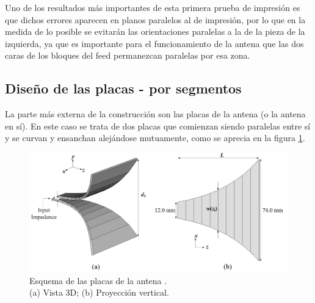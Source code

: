 \documentclass[11pt,a4paper,twoside,pdf]{article}
\numberwithin{equation}{section}
\begin{document}
Uno de los resultados más importantes de esta primera prueba de impresión es que dichos errores aparecen en planos paralelos al de impresión, por lo que en la medida de lo posible se evitarán las orientaciones paralelas a la de la pieza de la izquierda, ya que es importante para el funcionamiento de la antena que las dos caras de los bloques del feed permanezcan paralelas por esa zona.

\subsection{Diseño de las placas - por segmentos}\label{subsec:disSegmentos}

La parte más externa de la construcción son las placas de la antena (o la antena en sí). En este caso se trata de dos placas que comienzan siendo paralelas entre sí y se curvan y ensanchan alejándose mutuamente, como se aprecia en la figura \ref{fig:esquemaPlacas}.
\begin{figure}[!h]
    \centering
    \includegraphics[width=0.75\linewidth]{img/modelos/SoporteFeed/esquemaPlacas.png}
    \caption[Esquema de las placas de la antena \cite{tem_horn}.; (a) Vista 3D, (b) Proyección vertical.]
    {Esquema de las placas de la antena \cite{tem_horn}. \\ (a) Vista 3D; (b) Proyección vertical.\endtabular}
    \label{fig:esquemaPlacas}
\end{figure}
\end{document}
